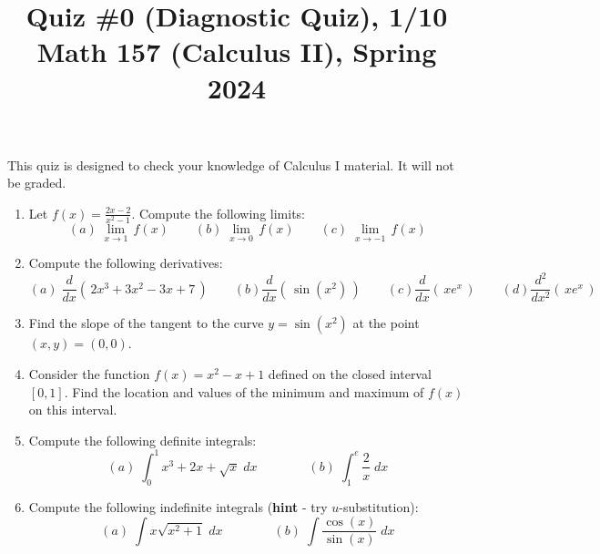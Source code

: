 \documentclass[11pt]{article}
\title{Quiz \#0 (Diagnostic Quiz), 1/10 \\ Math 157 (Calculus II), Spring 2024}
\date{}
\begin{document}
\maketitle

\thispagestyle{empty}

This quiz is designed to check your knowledge of Calculus I material. It will not be graded.

\begin{enumerate}
\item Let $\displaystyle f(x) = \frac{2x-2}{x^2-1}$. Compute the following limits:
\[ (a) \; \lim_{x \to 1} \, f(x) \qquad (b) \; \lim_{x \to 0} \, f(x) \qquad (c) \; \lim_{x \to -1} \, f(x)\]

\item Compute the following derivatives:
\[ (a) \; \frac{d}{dx}(\, 2x^3+3x^2-3x+7\, ) \qquad (b) \frac{d}{dx}(\, \sin(x^2) \,) \qquad (c) \frac{d}{dx} (\, x e^x \,) \qquad (d) \frac{d^2}{dx^2} (\, x e^x \,) \]

\item Find the slope of the tangent to the curve $y= \sin(x^2)$ at the point $(x,y) = (0,0)$.

\item Consider the function $f(x) = x^2-x+1$ defined on the closed interval $[0,1]$. Find the location and values of the minimum and maximum of $f(x)$ on this interval.

\item Compute the following definite integrals:
\[ (a) \; \int_{0}^{1} x^3 + 2x + \sqrt{x} \; dx \qquad \qquad (b) \; \int_{1}^{e} \frac{2}{x} \; dx \]

\item Compute the following indefinite integrals ({\bf hint} - try $u$-substitution):
\[ (a) \; \int x \sqrt{x^2+1} \; dx \qquad \qquad (b) \; \int \frac{\cos(x)}{\sin(x)} \; dx \]


\end{enumerate}
\end{document}
